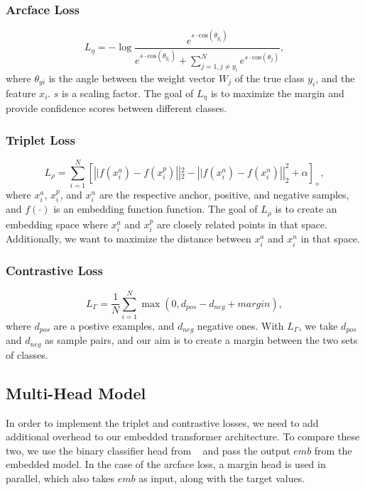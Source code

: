 \documentclass[10pt,twocolumn,letterpaper]{article}
\begin{document}
\subsubsection{Arcface Loss}
\begin{equation}
L_\eta = -\log \frac{e^{s\cdot \text{cos}(\theta_{y_i})}}{e^{s\cdot \text{cos}(\theta_{y_i})} + \sum_{j=1, j\neq y_i}^N e^{s\cdot \text{cos}(\theta_j)}},
\end{equation}
where $\theta_{yi}$ is the angle between the weight vector $W_j$ of the true class $y_i$, and the feature $x_i$. $s$ is a scaling factor. The goal of $L_\eta$ is to maximize 
the margin and provide confidence scores between different classes. 
\subsubsection{Triplet Loss}
\begin{equation}
    L_\rho = \sum_{i=1}^{N}\left[\left||f\left(x_{i}^{a}\right)-f\left(x_{i}^{p}\right)\right||_{2}^{2}-\left||f\left(x_{i}^{a}\right)-f\left(x_{i}^{n}\right)\right||_{2}^{2}+\alpha\right]_{+},
\end{equation}
where $x_i^a$, $x_i^p$, and $x_i^n$ are the respective anchor, positive, and negative samples, and $f(\cdot)$ is an embedding function function. The goal of $L_\rho$ is to create an embedding space where $x_i^a$ and $x_i^p$ are closely related points in that space. Additionally, 
we want to maximize the distance between $x_i^a$ and $x_i^n$ in that space.
\subsubsection{Contrastive Loss}
\begin{equation}
L_\Gamma = \frac{1}{N} \sum_{i=1}^N \max(0, d_{pos} - d_{neg} + margin),
\end{equation}
where $d_{pos}$ are a postive examples, and $d_{neg}$ negative ones. With $L_\Gamma$, we take $d_{pos}$ and $d_{neg}$ as sample pairs, and our aim is to create a margin between the two sets of classes.

\subsection{Multi-Head Model}
In order to implement the triplet and contrastive losses, we need to add additional overhead to our embedded transformer architecture. 
To compare these two, we use the binary classifier head from ~\cite{repo} and pass the output $emb$ from the embedded model.  In the case of the arcface loss, a margin head is used in parallel, which also takes $emb$ as input, along with the target values.
\end{document}
